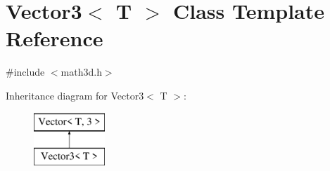\hypertarget{class_vector3}{}\section{Vector3$<$ T $>$ Class Template Reference}
\label{class_vector3}


{\ttfamily \#include $<$math3d.\+h$>$}

Inheritance diagram for Vector3$<$ T $>$\+:\begin{figure}[H]
\begin{center}
\leavevmode
\includegraphics[height=2.000000cm]{class_vector3}
\end{center}
\end{figure}
